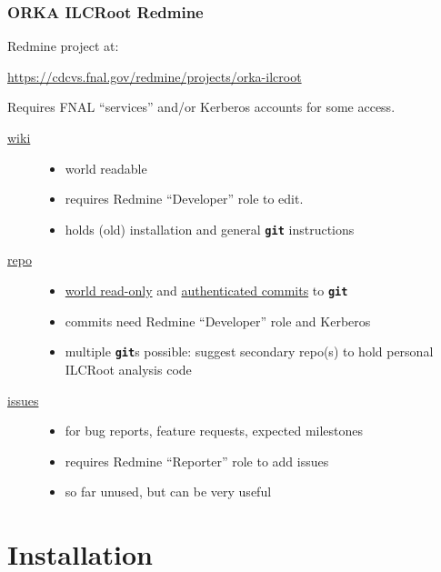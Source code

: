 \documentclass[xcolor=dvipsnames]{beamer}
\newcommand{\git}{\texttt{\textbf{git}}\xspace}
\begin{document}
\begin{frame}
  \frametitle{ORKA ILCRoot Redmine}
  Redmine project at:
  \begin{center}
    \url{https://cdcvs.fnal.gov/redmine/projects/orka-ilcroot}
  \end{center}
  Requires FNAL ``services'' and/or Kerberos accounts for some access.
  \begin{description}
  \item[\href{https://cdcvs.fnal.gov/redmine/projects/orka-ilcroot/wiki}{wiki}]
    \begin{itemize}
    \item world readable
    \item requires Redmine ``Developer'' role to edit.
    \item holds (old) installation and general \git instructions
    \end{itemize}
  \item[\href{https://cdcvs.fnal.gov/redmine/projects/orka-ilcroot/repository}{repo}] 
    \begin{itemize}
    \item \href{http://cdcvs.fnal.gov/projects/orka-ilcroot}{world read-only} 
      and 
      \href{ssh://p-orka-ilcroot@cdcvs.fnal.gov/cvs/projects/orka-ilcroot}{authenticated commits}
      to \git
    \item commits need Redmine ``Developer'' role and Kerberos
    \item multiple \git{}s possible: suggest secondary repo(s) to hold
      personal ILCRoot analysis code
    \end{itemize}
  \item[\href{https://cdcvs.fnal.gov/redmine/projects/orka-ilcroot/issues}{issues}]
    \begin{itemize}
    \item for bug reports, feature requests, expected milestones
    \item requires Redmine ``Reporter'' role to add issues
    \item so far unused, but can be very useful
    \end{itemize}
  \end{description}

  
\end{frame}

\section{Installation}
\end{document}
